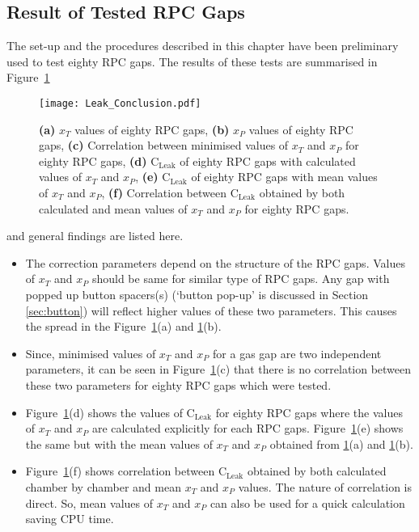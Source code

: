 \subsection{Result of Tested RPC Gaps}
The set-up and the procedures described in this chapter have been preliminary used to test eighty RPC gaps. The results of these tests are summarised in Figure~\ref{fig:conclusion}
\begin{figure}[h]
  \centering
  \texttt{[image: Leak\_Conclusion.pdf]}
  \caption{\textbf{(a)} $x_T$ values of eighty RPC gaps, \textbf{(b)} $x_P$ values of eighty RPC gaps, \textbf{(c)} Correlation between minimised values of $x_T$ and $x_P$ for eighty RPC gaps, \textbf{(d)} $\textrm{C}_{\textrm{Leak}}$ of eighty RPC gaps with calculated values of $x_T$ and $x_P$, \textbf{(e)} $\textrm{C}_{\textrm{Leak}}$ of eighty RPC gaps with mean values of $x_T$ and $x_P$, \textbf{(f)} Correlation between $\textrm{C}_{\textrm{Leak}}$ obtained by both calculated and mean values of $x_T$ and $x_P$ for eighty RPC gaps.}
  \label{fig:conclusion}
\end{figure}
and general findings are listed here.
\begin{itemize} \itemsep -3pt
\item The correction parameters depend on the structure of the RPC gaps. Values of $x_T$ and $x_P$ should be same for similar type of RPC gaps. Any gap with popped up button spacers(s) (`button pop-up' is discussed in Section \ref{sec:button}) will reflect higher values of these two parameters. This causes the spread in the Figure~\ref{fig:conclusion}(a) and \ref{fig:conclusion}(b).
\item Since, minimised values of $x_T$ and $x_P$ for a gas gap are two independent parameters, it can be seen in Figure~\ref{fig:conclusion}(c) that there is no correlation between these two parameters for eighty RPC gaps which were tested.
\item Figure~\ref{fig:conclusion}(d) shows the values of $\textrm{C}_{\textrm{Leak}}$ for eighty RPC gaps where the values of $x_T$ and $x_P$ are calculated explicitly for each RPC gaps. Figure~\ref{fig:conclusion}(e) shows the same but with the mean values of $x_T$ and $x_P$ obtained from \ref{fig:conclusion}(a) and \ref{fig:conclusion}(b).
\item Figure~\ref{fig:conclusion}(f) shows correlation between $\textrm{C}_{\textrm{Leak}}$ obtained by both calculated chamber by chamber and mean $x_T$ and $x_P$ values. The nature of correlation is direct. So, mean values of $x_T$ and $x_P$ can also be used for a quick calculation saving CPU time.
\end{itemize}
